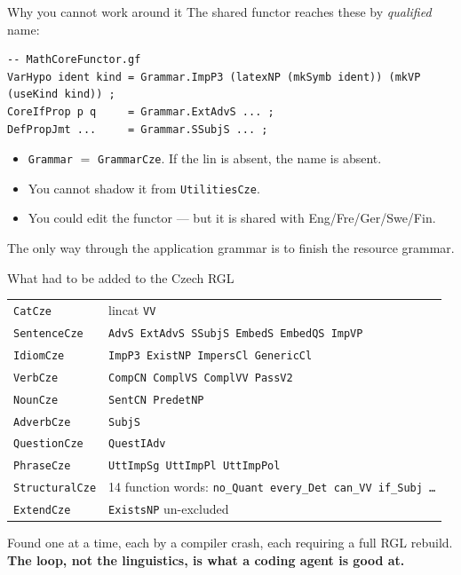 \documentclass[10pt,aspectratio=169]{beamer}
\begin{document}
\begin{frame}[fragile]{Why you cannot work around it}
  The shared functor reaches these by \emph{qualified} name:

\begin{lstlisting}
-- MathCoreFunctor.gf
VarHypo ident kind = Grammar.ImpP3 (latexNP (mkSymb ident)) (mkVP (useKind kind)) ;
CoreIfProp p q     = Grammar.ExtAdvS ... ;
DefPropJmt ...     = Grammar.SSubjS ... ;
\end{lstlisting}

  \begin{itemize}
    \item \texttt{Grammar} $=$ \texttt{GrammarCze}. If the lin is absent, the name is absent.
    \item You cannot shadow it from \texttt{UtilitiesCze}.
    \item You could edit the functor --- but it is shared with Eng/Fre/Ger/Swe/Fin.
  \end{itemize}

  \vspace{0.5em}
  \alert{The only way through the application grammar is to finish the resource grammar.}
\end{frame}

\begin{frame}{What had to be added to the Czech RGL}
  \small
  \begin{center}
  \begin{tabular}{ll}
    \toprule
    \texttt{CatCze} & lincat \texttt{VV} \\
    \texttt{SentenceCze} & \texttt{AdvS ExtAdvS SSubjS EmbedS EmbedQS ImpVP} \\
    \texttt{IdiomCze} & \texttt{ImpP3 ExistNP ImpersCl GenericCl} \\
    \texttt{VerbCze} & \texttt{CompCN ComplVS ComplVV PassV2} \\
    \texttt{NounCze} & \texttt{SentCN PredetNP} \\
    \texttt{AdverbCze} & \texttt{SubjS} \\
    \texttt{QuestionCze} & \texttt{QuestIAdv} \\
    \texttt{PhraseCze} & \texttt{UttImpSg UttImpPl UttImpPol} \\
    \texttt{StructuralCze} & 14 function words: \texttt{no\_Quant every\_Det can\_VV if\_Subj \dots} \\
    \texttt{ExtendCze} & \texttt{ExistsNP} un-excluded \\
    \bottomrule
  \end{tabular}
  \end{center}

  \vspace{0.5em}
  Found one at a time, each by a compiler crash, each requiring a full RGL rebuild.
  \\ \textbf{The loop, not the linguistics, is what a coding agent is good at.}
\end{frame}
\end{document}
